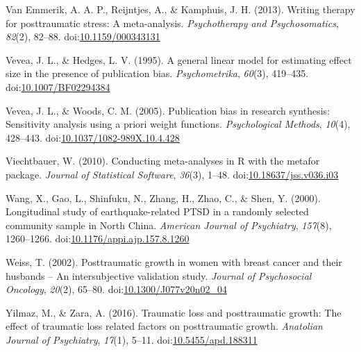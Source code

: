 \documentclass[man]{apa6}
\theoremstyle{definition}
\theoremstyle{definition}
\theoremstyle{definition}
\theoremstyle{remark}
\begin{document}
\hypertarget{ref-VanEmmerik2013}{}
Van Emmerik, A. A. P., Reijntjes, A., \& Kamphuis, J. H. (2013). Writing
therapy for posttraumatic stress: A meta-analysis. \emph{Psychotherapy
and Psychosomatics}, \emph{82}(2), 82--88.
doi:\href{https://doi.org/10.1159/000343131}{10.1159/000343131}

\hypertarget{ref-Vevea1995}{}
Vevea, J. L., \& Hedges, L. V. (1995). A general linear model for
estimating effect size in the presence of publication bias.
\emph{Psychometrika}, \emph{60}(3), 419--435.
doi:\href{https://doi.org/10.1007/BF02294384}{10.1007/BF02294384}

\hypertarget{ref-Vevea2005}{}
Vevea, J. L., \& Woods, C. M. (2005). Publication bias in research
synthesis: Sensitivity analysis using a priori weight functions.
\emph{Psychological Methods}, \emph{10}(4), 428--443.
doi:\href{https://doi.org/10.1037/1082-989X.10.4.428}{10.1037/1082-989X.10.4.428}

\hypertarget{ref-Viechtbauer2010}{}
Viechtbauer, W. (2010). Conducting meta-analyses in R with the metafor
package. \emph{Journal of Statistical Software}, \emph{36}(3), 1--48.
doi:\href{https://doi.org/10.18637/jss.v036.i03}{10.18637/jss.v036.i03}

\hypertarget{ref-Wang2000}{}
Wang, X., Gao, L., Shinfuku, N., Zhang, H., Zhao, C., \& Shen, Y.
(2000). Longitudinal study of earthquake-related PTSD in a randomly
selected community sample in North China. \emph{American Journal of
Psychiatry}, \emph{157}(8), 1260--1266.
doi:\href{https://doi.org/10.1176/appi.ajp.157.8.1260}{10.1176/appi.ajp.157.8.1260}

\hypertarget{ref-Weiss2002}{}
Weiss, T. (2002). Posttraumatic growth in women with breast cancer and
their husbands -- An intersubjective validation study. \emph{Journal of
Psychosocial Oncology}, \emph{20}(2), 65--80.
doi:\href{https://doi.org/10.1300/J077v20n02_04}{10.1300/J077v20n02\_04}

\hypertarget{ref-Yilmaz2016}{}
Yilmaz, M., \& Zara, A. (2016). Traumatic loss and posttraumatic growth:
The effect of traumatic loss related factors on posttraumatic growth.
\emph{Anatolian Journal of Psychiatry}, \emph{17}(1), 5--11.
doi:\href{https://doi.org/10.5455/apd.188311}{10.5455/apd.188311}
\end{document}

